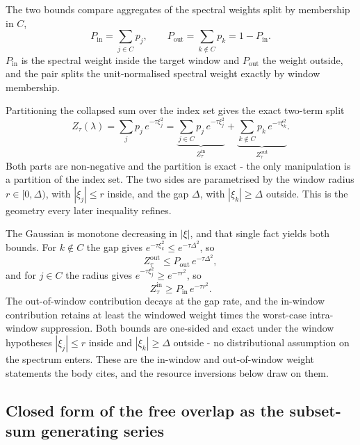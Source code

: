 The two bounds compare aggregates of the spectral weights split by membership in $C$,
\begin{equation}\label{def:in-out-spectral-weights}
P_{\mathrm{in}} = \sum_{j \in C} p_j , \qquad
P_{\mathrm{out}} = \sum_{k \notin C} p_k = 1 - P_{\mathrm{in}} .
\end{equation}
$P_{\mathrm{in}}$ is the spectral weight inside the target window and $P_{\mathrm{out}}$ the weight outside, and the pair splits the unit-normalised spectral weight exactly by window membership.

Partitioning the collapsed sum over the index set gives the exact two-term split
\begin{equation*}
Z_\tau(\lambda) = \sum_j p_j \, e^{-\tau \xi_j^2}
= \underbrace{\sum_{j \in C} p_j \, e^{-\tau \xi_j^2}}_{Z_\tau^{\mathrm{in}}}
+ \underbrace{\sum_{k \notin C} p_k \, e^{-\tau \xi_k^2}}_{Z_\tau^{\mathrm{out}}} .
\end{equation*}
Both parts are non-negative and the partition is exact - the only manipulation is a partition of the index set. The two sides are parametrised by the window radius $r \in [0, \Delta)$, with $|\xi_j| \le r$ inside, and the gap $\Delta$, with $|\xi_k| \ge \Delta$ outside. This is the geometry every later inequality refines.

The Gaussian is monotone decreasing in $|\xi|$, and that single fact yields both bounds. For $k \notin C$ the gap gives $e^{-\tau \xi_k^2} \le e^{-\tau \Delta^2}$, so
\begin{equation*}
Z_\tau^{\mathrm{out}} \le P_{\mathrm{out}} \, e^{-\tau \Delta^2} ,
\end{equation*}
and for $j \in C$ the radius gives $e^{-\tau \xi_j^2} \ge e^{-\tau r^2}$, so
\begin{equation*}
Z_\tau^{\mathrm{in}} \ge P_{\mathrm{in}} \, e^{-\tau r^2} .
\end{equation*}
The out-of-window contribution decays at the gap rate, and the in-window contribution retains at least the windowed weight times the worst-case intra-window suppression. Both bounds are one-sided and exact under the window hypotheses $|\xi_j| \le r$ inside and $|\xi_k| \ge \Delta$ outside - no distributional assumption on the spectrum enters. These are the in-window and out-of-window weight statements the body cites, and the resource inversions below draw on them.

\subsection*{Closed form of the free overlap as the subset-sum generating series}

